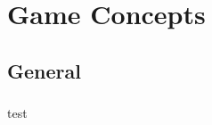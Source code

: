 \documentclass{article}
\begin{document}
\section{Game Concepts}

\subsection{General}

\subsubsection{}

test
\end{document}

